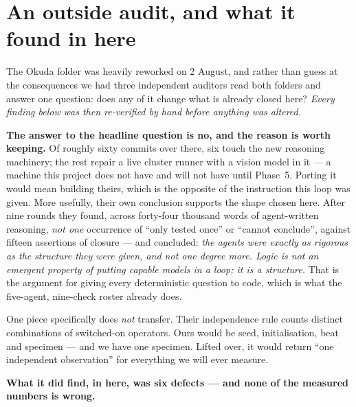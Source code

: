 \documentclass[11pt,a4paper]{article}
\begin{document}
\section{An outside audit, and what it found in here}\label{sec:audit}

The Okuda folder was heavily reworked on 2 August, and rather than guess at the consequences we
had three independent auditors read both folders and answer one question: does any of it change
what is already closed here? \emph{Every finding below was then re-verified by hand before
anything was altered.}

\textbf{The answer to the headline question is no, and the reason is worth keeping.} Of roughly
sixty commits over there, six touch the new reasoning machinery; the rest repair a live cluster
runner with a vision model in it --- a machine this project does not have and will not have until
Phase~5. Porting it would mean building theirs, which is the opposite of the instruction this loop
was given. More usefully, their own conclusion supports the shape chosen here. After nine rounds
they found, across forty-four thousand words of agent-written reasoning, \emph{not one} occurrence
of ``only tested once'' or ``cannot conclude'', against fifteen assertions of closure --- and
concluded: \emph{the agents were exactly as rigorous as the structure they were given, and not one
degree more. Logic is not an emergent property of putting capable models in a loop; it is a
structure.} That is the argument for giving every deterministic question to code, which is what the
five-agent, nine-check roster already does.

One piece specifically does \emph{not} transfer. Their independence rule counts distinct
combinations of switched-on operators. Ours would be seed, initialisation, beat and specimen ---
and we have one specimen. Lifted over, it would return ``one independent observation'' for
everything we will ever measure.

\textbf{What it did find, in here, was six defects --- and none of the measured numbers is wrong.}
\end{document}
